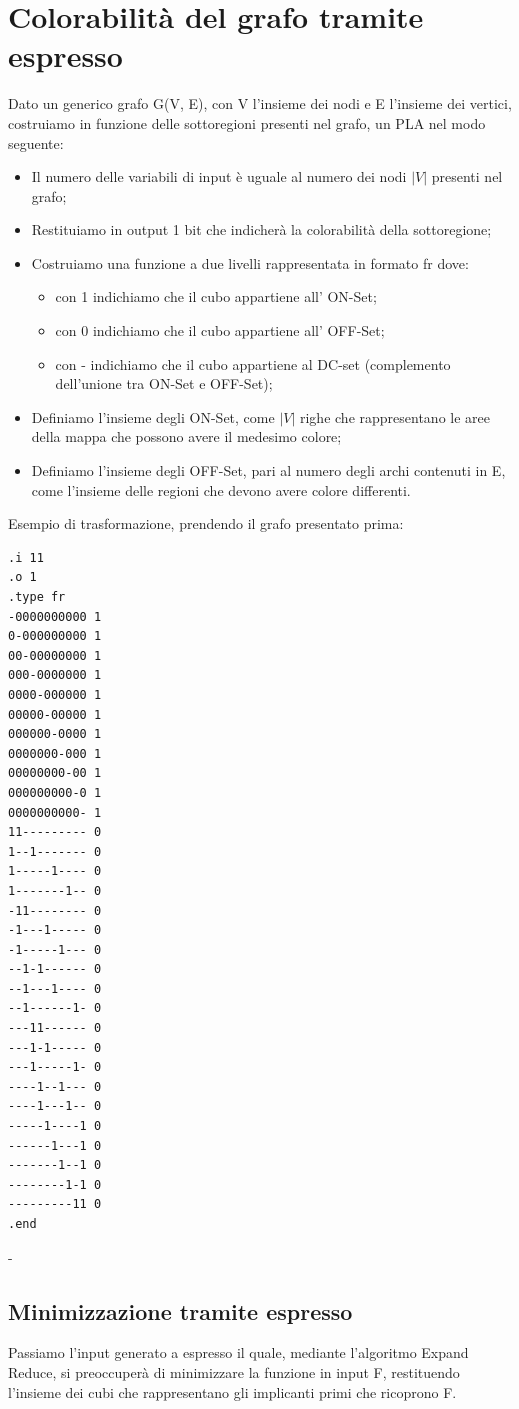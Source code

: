 \documentclass[a4paper,11pt]{article} %
\begin{document}
\section{Colorabilità del grafo tramite espresso}

Dato un generico grafo G(V, E), con V l’insieme dei nodi e E l’insieme dei vertici, costruiamo in funzione delle
sottoregioni presenti nel grafo, un PLA nel modo seguente:
\begin{itemize}
	\item Il numero delle variabili di input è uguale al numero dei nodi $|V|$ presenti nel grafo;
	\item Restituiamo in output 1 bit che indicherà la colorabilità della sottoregione;
	\item Costruiamo una funzione a due livelli rappresentata in formato fr dove:
	\begin{itemize}
		\item con  1 indichiamo che il cubo appartiene all' ON-Set;
		\item con  0 indichiamo che il cubo appartiene all' OFF-Set;
		\item con - indichiamo che il cubo appartiene al DC-set (complemento dell’unione tra ON-Set e OFF-Set);
	\end{itemize}
	\item Definiamo l’insieme degli ON-Set, come $|V|$ righe che rappresentano le aree della mappa che possono avere il medesimo colore;
	\item Definiamo l’insieme degli OFF-Set, pari al numero degli archi contenuti in E, come l’insieme delle regioni
	che devono avere colore differenti.
\end{itemize}
Esempio di trasformazione, prendendo il grafo presentato prima:
\begin{verbatim}
.i 11
.o 1
.type fr
-0000000000 1
0-000000000 1
00-00000000 1
000-0000000 1
0000-000000 1
00000-00000 1
000000-0000 1
0000000-000 1
00000000-00 1
000000000-0 1
0000000000- 1
11--------- 0
1--1------- 0
1-----1---- 0
1-------1-- 0
-11-------- 0
-1---1----- 0
-1-----1--- 0
--1-1------ 0
--1---1---- 0
--1------1- 0
---11------ 0
---1-1----- 0
---1-----1- 0
----1--1--- 0
----1---1-- 0
-----1----1 0
------1---1 0
-------1--1 0
--------1-1 0
---------11 0
.end
\end{verbatim}
-\subsection{Minimizzazione tramite espresso}
Passiamo l’input generato a espresso il quale, mediante l’algoritmo Expand Reduce, si preoccuperà di minimizzare la funzione in input F, restituendo l’insieme dei cubi che rappresentano gli implicanti primi che ricoprono F.\\
\end{document}
